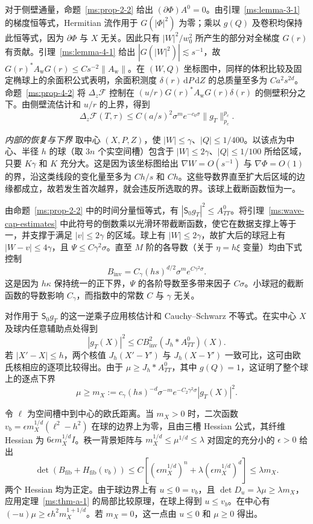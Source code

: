 对于侧壁通量，命题~\ref{ms:prop-2-2} 给出 $(\partial\Phi)A^0=0$。由引理~\ref{ms:lemma-3-1} 的梯度恒等式，Hermitian 流作用于 $G(|\Phi|^2)$ 为零；乘以 $g(Q)$ 及卷积均保持此恒等式，因为 $\partial\Phi$ 与 $X$ 无关。因此只有 $|W|^2/w_0^2$ 所产生的部分对全梯度 $G(r)$ 有贡献。引理~\ref{ms:lemma-4-1} 给出 $|G(|W|^2)|\lesssim s^{-1}$，故 $G(r)^*A_{\mathrm w}G(r)\le Cs^{-2}\|A_{\mathrm w}\|$。在 $(W,Q)$ 坐标图中，同样的体积比较及固定椭球上的余面积公式表明，余面积测度 $\delta(r)\,\mathrm dP\,\mathrm dZ$ 的总质量至多为 $Ca^2s^{2d}$。命题~\ref{ms:prop-4-2} 将 $\Delta_z\mathcal F$ 控制在 $(u/r)G(r)^*A_{\mathrm w}G(r)\delta(r)$ 的侧壁积分之下。由侧壁流估计和 $u/r$ 的上界，得到
\[
\Delta_z\mathcal F(T,\tau)\le C(a/s)^2\sigma^me^{-c_0\sigma}\|g_T\|_{p_c}^{p_c}.
\]

\smallskip
\noindent\textit{内部的恢复与下界}
取中心 $(X,P,Z)$，使 $|W|\le\gamma$、$|Q|\le1/400$。以该点为中心、半径 $h$ 的球（取 $3n$ 个实空间槽）包含于 $|W|\le2\gamma$、$|Q|\le1/100$ 所给区域，只要 $K\gamma$ 和 $K$ 充分大。这是因为该坐标图给出 $\nabla W=O(s^{-1})$ 与 $\nabla\Phi=O(1)$ 的界，沿这类线段的变化量至多为 $Ch/s$ 和 $Ch$。这些导数界直至扩大后区域的边缘都成立，故若发生首次越界，就会违反所选取的界。该球上截断函数恒为一。

由命题~\ref{ms:prop-2-2} 中的时间分量恒等式，有 $|\mathsf S_0g_T|^2\le A^0_{TT}$。将引理~\ref{ms:wave-cap-estimates} 中此符号的倒数乘以光滑环带截断函数，使它在数据支撑上等于一，并支撑于满足 $|v|\le2\gamma$ 的区域。球上有 $|W|\le2\gamma$，故扩大后的球冠上有 $|W-v|\le4\gamma$，且 $\Psi\le C\gamma^2\sigma$。直至 $M$ 阶的各导数（关于 $\eta=h\xi$ 变量）均由下式控制
\[
B_{\mathrm{inv}}=C_\gamma(hs)^{d/2}\sigma^me^{C\gamma^2\sigma}.
\]
这是因为 $h\kappa$ 保持统一的正下界，$\Psi$ 的各阶导数至多带来因子 $C\sigma$。小球冠的截断函数的导数影响 $C_\gamma$，而指数中的常数 $C$ 与 $\gamma$ 无关。

对作用于 $\mathsf S_0g_T$ 的这一逆乘子应用核估计和 Cauchy--Schwarz 不等式。在实中心 $X$ 及球内任意辅助点处得到
\[
|g_T(X)|^2\le CB_{\mathrm{inv}}^2(J_h*A^0_{TT})(X).
\]
若 $|X'-X|\le h$，两个核值 $J_h(X'-Y')$ 与 $J_h(X-Y')$ 一致可比，这可由欧氏核相应的逐项比较得出。由于 $\mu\ge J_h*A^0_{TT}$，其中 $g(Q)=1$，这证明了整个球上的逐点下界
\[
\mu\ge m_X:=c_\gamma(hs)^{-d}\sigma^{-m}e^{-C_2\gamma^2\sigma}|g_T(X)|^2.
\]

令 $\ell$ 为空间槽中到中心的欧氏距离。当 $m_X>0$ 时，二次函数 $v_b=\epsilon m_X^{1/d}(\ell^2-h^2)$ 在球的边界上为零，且由三槽 Hessian 公式，其纤维 Hessian 为 $6\epsilon m_X^{1/d}I$。秩一背景矩阵与 $m_X^{1/d}\le \mu^{1/d}\le\lambda$ 对固定的充分小的 $\epsilon>0$ 给出
\[
\det(B_{\mathrm{fib}}+H_{\mathrm{fib}}(v_b))
\le C[(\epsilon m_X^{1/d})^n+\lambda(\epsilon m_X^{1/d})^d]
\le\lambda m_X .
\]
两个 Hessian 均为正定。由于球边界上有 $u\le0=v_b$，且 $\det D_u=\lambda\mu\ge\lambda m_X$，应用定理~\ref{ms:thm-a-1} 的局部比较原理，在球上得到 $u\le v_b$。在中心有 $(-u)\mu\ge\epsilon h^2m_X^{1+1/d}$。若 $m_X=0$，这一点由 $u\le0$ 和 $\mu\ge0$ 得出。

